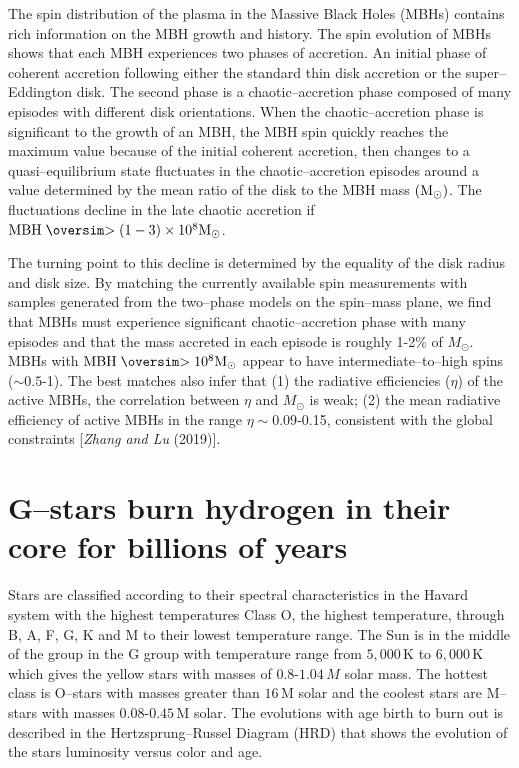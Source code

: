 \documentclass[a4paper,openany,12pt]{book}
\def\nms{\mathsurround=0pt}
\def\gtsim{\mathrel{\mathpalette\oversim>}} %
\def\oversim#1#2{\lower 2pt\vbox{\baselineskip 0pt \lineskip 1pt
    \ialign{$\nms#1\hfil##\hfil$\crcr#2\crcr\sim\crcr}}}
\begin{document}
The spin distribution of the plasma in the Massive Black Holes (MBHs) contains rich information on the MBH growth and history. The spin evolution of MBHs shows that each MBH experiences two phases of accretion. An initial phase of coherent accretion following either the standard thin disk accretion or the super--Eddington disk. The second phase is a chaotic--accretion phase composed of many episodes with different disk orientations. When the chaotic--accretion phase is significant to the growth of an MBH, the MBH spin quickly reaches the maximum value because of the initial coherent accretion, then changes to a quasi--equilibrium state fluctuates in the chaotic--accretion episodes around a value determined by the mean ratio of the disk to the MBH mass $(\rm M_\odot)$. The fluctuations decline in the late chaotic accretion if  $\mathrm{MBH}\gtsim(1-3)\times 10^8\rm M_\odot$.

The turning point to this decline is determined by the equality of the disk radius and disk size. By matching the currently available spin measurements with samples generated from the two--phase models on the spin--mass plane, we find that MBHs must experience significant chaotic--accretion phase with many episodes and that the mass accreted in each episode is roughly 1-2\% of $M_\odot$. MBHs with $\mathrm{MBH}\gtsim 10^8\rm M_\odot$ appear to have intermediate--to--high spins ($\sim 0.5$-1). The best matches also infer that (1) the radiative efficiencies ($\eta$) of the active MBHs, the correlation between $\eta$ and $M_\odot$ is weak; (2) the mean radiative efficiency of active MBHs in the range $\eta\sim 0.09$-0.15, consistent with the global constraints [\emph{Zhang and Lu} (2019)].

\section{G--stars burn hydrogen in their core for billions of years}

Stars are classified according to their spectral characteristics  in the Havard system with the highest temperatures Class O, the highest temperature,  through B, A, F, G, K and M to their lowest temperature range. The Sun is in the middle of the group in the G group with temperature range from $5,000\,$K to $6,000\,$K which gives the  yellow stars with masses of 0.8-$1.04\,M$ solar mass. The hottest class is O--stars with masses greater than $16\,$M solar and the coolest stars are M--stars with masses 0.08-$0.45\,$M solar. The evolutions with age birth to burn out is described in the Hertzsprung--Russel Diagram (HRD) that shows the evolution of the stars luminosity versus color and age. 
\end{document}
